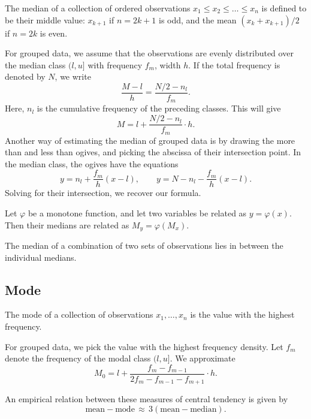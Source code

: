 \documentclass[11pt]{article}
\theoremstyle{definition}
\theoremstyle{remark}
\numberwithin{equation}{section}
\begin{document}
    The median of a collection of ordered observations $x_1 \leq x_2 \leq \dots \leq
    x_n$ is defined to be their middle value: $x_{k + 1}$ if $n = 2k + 1$ is odd, and
    the mean $(x_{k} + x_{k + 1}) / 2$ if $n = 2k$ is even.

    For grouped data, we assume that the observations are evenly distributed over
    the median class $(l, u]$ with frequency $f_m$, width $h$. If the total frequency
    is denoted by $N$, we write \[
        \frac{M - l}{h} = \frac{N / 2 - n_l}{f_m}.
    \] Here, $n_l$ is the cumulative frequency of the preceding classes. This will
    give \[
        M = l + \frac{N / 2 - n_l}{f_m}\cdot h.
    \] Another way of estimating the median of grouped data is by drawing the more than
    and less than ogives, and picking the abscissa of their intersection point. In
    the median class, the ogives have the equations \[
        y = n_l + \frac{f_m}{h}(x - l), \qquad y = N - n_l - \frac{f_m}{h}(x - l).
    \] Solving for their intersection, we recover our formula.

    \begin{theorem}
        Let $\varphi$ be a monotone function, and let two variables be related as $y
        = \varphi(x)$. Then their medians are related as $M_y = \varphi(M_x)$.
    \end{theorem}
    
    \begin{theorem}
        The median of a combination of two sets of observations lies in between the
        individual medians.
    \end{theorem}


    \subsection{Mode}
    
    The mode of a collection of observations $x_1, \dots, x_n$ is the value with the
    highest frequency.

    For grouped data, we pick the value with the highest frequency density. Let $f_m$
    denote the frequency of the modal class $(l, u]$. We approximate \[
        M_0 = l + \frac{f_m - f_{m - 1}}{2f_m - f_{m - 1} - f_{m + 1}} \cdot h.
    \] 


    \begin{theorem}
        An empirical relation between these measures of central tendency is given by
        \[
            \text{mean} - \text{mode} \,\approx\, 3(\text{mean} - \text{median}).
        \] 
    \end{theorem}
\end{document}
